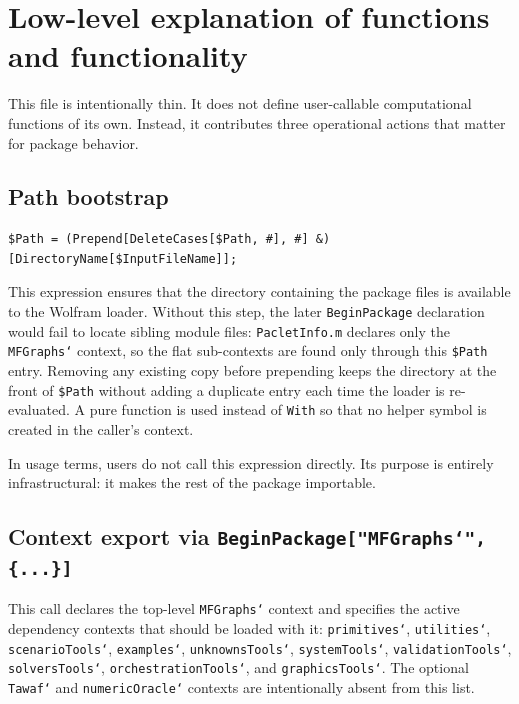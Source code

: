 \documentclass[11pt]{article}
\begin{document}
\section{Low-level explanation of functions and functionality}

This file is intentionally thin. It does not define user-callable computational functions of its own. Instead, it contributes three operational actions that matter for package behavior.

\subsection*{Path bootstrap}

\begin{verbatim}
$Path = (Prepend[DeleteCases[$Path, #], #] &)[DirectoryName[$InputFileName]];
\end{verbatim}

This expression ensures that the directory containing the package files is available to the Wolfram loader. Without this step, the later \texttt{BeginPackage} declaration would fail to locate sibling module files: \texttt{PacletInfo.m} declares only the \texttt{MFGraphs`} context, so the flat sub-contexts are found only through this \texttt{\$Path} entry. Removing any existing copy before prepending keeps the directory at the front of \texttt{\$Path} without adding a duplicate entry each time the loader is re-evaluated. A pure function is used instead of \texttt{With} so that no helper symbol is created in the caller's context.

In usage terms, users do not call this expression directly. Its purpose is entirely infrastructural: it makes the rest of the package importable.

\subsection*{Context export via \texttt{BeginPackage["MFGraphs`", \{...\}]}}

This call declares the top-level \texttt{MFGraphs`} context and specifies the active dependency contexts that should be loaded with it: \texttt{primitives`}, \texttt{utilities`}, \texttt{scenarioTools`}, \texttt{examples`}, \texttt{unknownsTools`}, \texttt{systemTools`}, \texttt{validationTools`}, \texttt{solversTools`}, \texttt{orchestrationTools`}, and \texttt{graphicsTools`}. The optional \texttt{Tawaf`} and \texttt{numericOracle`} contexts are intentionally absent from this list.
\end{document}
